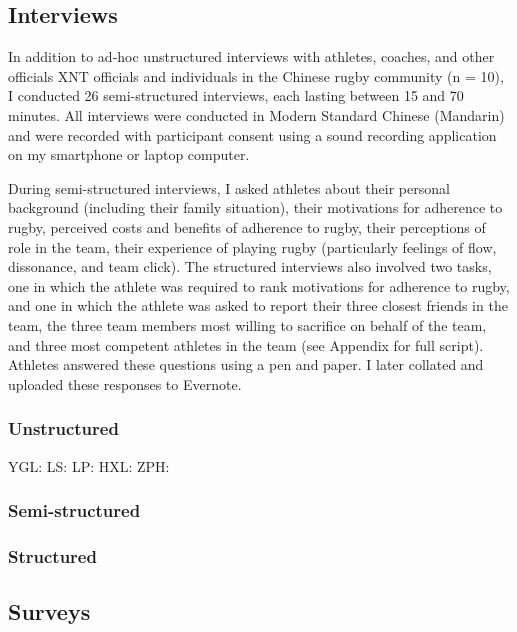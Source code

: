   \subsection{Interviews}

  In addition to ad-hoc unstructured interviews with athletes, coaches, and other officials XNT officials and individuals in the Chinese rugby community (n = 10), I conducted 26 semi-structured interviews, each lasting between 15 and 70 minutes.  All interviews were conducted in Modern Standard Chinese (Mandarin) and were recorded with participant consent using a sound recording application on my smartphone or laptop computer.

  During semi-structured interviews, I asked athletes about their personal background (including their family situation), their motivations for adherence to rugby, perceived costs and benefits of adherence to rugby, their perceptions of role in the team, their experience of playing rugby (particularly feelings of flow, dissonance, and team click).  The structured interviews also involved two tasks, one in which the athlete was required to rank motivations for adherence to rugby, and one in which the athlete was asked to report their three closest friends in the team, the three team members most willing to sacrifice on behalf of the team, and three most competent athletes in the team (see Appendix for full script). Athletes answered these questions using a pen and paper. I later collated and uploaded these responses to Evernote.

    \subsubsection{Unstructured}

YGL:
LS:
LP:
HXL:
ZPH:

    \subsubsection{Semi-structured} %

    \subsubsection{Structured}


  \subsection{Surveys}

